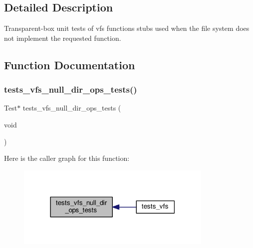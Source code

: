 \subsection{Detailed Description}
Transparent-\/box unit tests of vfs functions stubs used when the file system does not implement the requested function. 



\subsection{Function Documentation}
\mbox{\label{tests-vfs-dir-ops_8c_a5e6248f295aefb41b6a0888f647e8fd9}} 
\subsubsection{\texorpdfstring{tests\+\_\+vfs\+\_\+null\+\_\+dir\+\_\+ops\+\_\+tests()}{tests\_vfs\_null\_dir\_ops\_tests()}}
{\footnotesize\ttfamily Test$\ast$ tests\+\_\+vfs\+\_\+null\+\_\+dir\+\_\+ops\+\_\+tests (\begin{DoxyParamCaption}\item[{void}]{ }\end{DoxyParamCaption})}

Here is the caller graph for this function\+:
\nopagebreak
\begin{figure}[H]
\begin{center}
\leavevmode
\includegraphics[width=266pt]{tests-vfs-dir-ops_8c_a5e6248f295aefb41b6a0888f647e8fd9_icgraph}
\end{center}
\end{figure}

